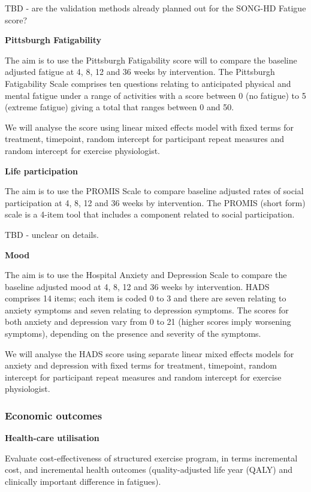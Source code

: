 \documentclass[
]{article}
\begin{document}
TBD - are the validation methods already planned out for the SONG-HD Fatigue score?

\textbf{Pittsburgh Fatigability}

The aim is to use the Pittsburgh Fatigability score will to compare the baseline adjusted fatigue at 4, 8, 12 and 36 weeks by intervention.
The Pittsburgh Fatigability Scale comprises ten questions relating to anticipated physical and mental fatigue under a range of activities with a score between 0 (no fatigue) to 5 (extreme fatigue) giving a total that ranges between 0 and 50.

We will analyse the score using linear mixed effects model with fixed terms for treatment, timepoint, random intercept for participant repeat measures and random intercept for exercise physiologist.

\textbf{Life participation}

The aim is to use the PROMIS Scale to compare baseline adjusted rates of social participation at 4, 8, 12 and 36 weeks by intervention.
The PROMIS (short form) scale is a 4-item tool that includes a component related to social participation.

TBD - unclear on details.

\textbf{Mood}

The aim is to use the Hospital Anxiety and Depression Scale to compare the baseline adjusted mood at 4, 8, 12 and 36 weeks by intervention.
HADS comprises 14 items; each item is coded 0 to 3 and there are seven relating to anxiety symptoms and seven relating to depression symptoms.
The scores for both anxiety and depression vary from 0 to 21 (higher scores imply worsening symptoms), depending on the presence and severity of the symptoms.

We will analyse the HADS score using separate linear mixed effects models for anxiety and depression with fixed terms for treatment, timepoint, random intercept for participant repeat measures and random intercept for exercise physiologist.




\hypertarget{economic-outcomes}{%
  \subsubsection{Economic outcomes}\label{economic-outcomes}}

\textbf{Health-care utilisation}

Evaluate cost-effectiveness of structured exercise program, in terms incremental cost, and incremental health outcomes (quality-adjusted life year (QALY) and clinically important difference in fatigues).
\end{document}

